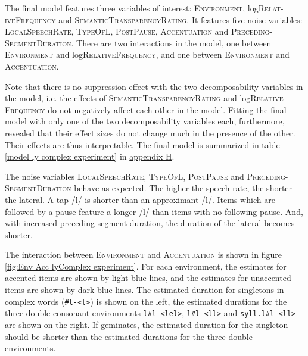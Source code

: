 The final model features three variables of interest: \textsc{Environment}, log\textsc{Relat-iveFrequency} and \textsc{SemanticTransparencyRating}. It features five noise variables: \textsc{LocalSpeechRate}, \textsc{TypeOfL}, \textsc{PostPause}, \textsc{Accentuation} and \textsc{Preceding-SegmentDuration}. 
There are two interactions in the model, one between \textsc{Environment} and log\textsc{RelativeFrequency}, and one between \textsc{Environment} and \textsc{Accentuation}. 

Note that there is no suppression effect with the two decomposability variables in the model, i.e. the effects of  \textsc{SemanticTransparencyRating} and log\textsc{Relative- Frequency} do not negatively affect each other in the model. Fitting the final model with only one of the two decomposability variables each, furthermore, revealed that their effect sizes do not change much in the presence of the other. Their effects are thus interpretable.
The final model is summarized in table \ref{model ly complex experiment} in \hyperref[Appendix H: Model Summaries Experiment]{appendix H}.

The noise variables \textsc{LocalSpeechRate}, \textsc{TypeOfL}, \textsc{PostPause} and \textsc{Preceding- SegmentDuration} behave as expected. The higher the speech rate, the shorter the lateral. A tap /l/ is shorter than an approximant /l/. Items which are followed by a pause feature a longer /l/ than items with no following pause. And, with increased preceding segment duration, the duration of the lateral becomes shorter.

\clearpage

The interaction between \textsc{Environment} and \textsc{Accentuation} is shown in figure \ref{fig:Env Acc lyComplex experiment}. 
For each environment, the estimates for accented items are shown by light blue lines, and the estimates for unaccented items are shown by dark blue lines. The estimated duration for singletons in complex words (\texttt{\#l-<l>}) is shown on the left, the estimated durations for the three double consonant environments \texttt{l\#l-<lel>}, \texttt{l\#l-<ll>} and \texttt{syll.l\#l-<ll>} are shown on the right. If  geminates, the estimated duration for the singleton should be shorter than the estimated durations for the three double environments. 


